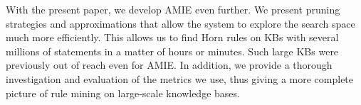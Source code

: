With the present paper, we develop AMIE even further.
We present pruning strategies and approximations that allow the system to explore the search space much more efficiently.
This allows us to find Horn rules on KBs with several millions of statements in a matter of hours or minutes.
Such large KBs were previously out of reach even for AMIE. %
In addition, we provide a thorough investigation and evaluation of the metrics we use,
thus giving a more complete picture of rule mining on large-scale knowledge bases.

